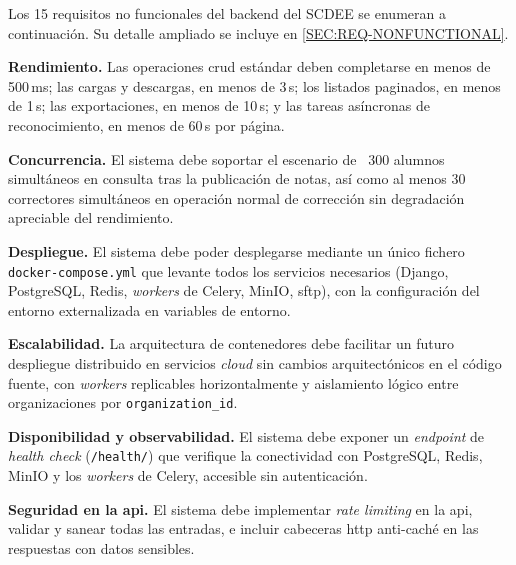 Los 15 requisitos no funcionales del backend del SCDEE se enumeran a
continuación. Su detalle ampliado se incluye en \cref{SEC:REQ-NONFUNCTIONAL}.

\begin{nonfunctional}

  \item \textbf{Rendimiento.} \label{rnf:performance}
  Las operaciones \acs{crud} estándar deben completarse en menos de
  500\,ms; las cargas y descargas, en menos de 3\,s; los listados
  paginados, en menos de 1\,s; las exportaciones, en menos de 10\,s; y las
  tareas asíncronas de reconocimiento, en menos de 60\,s por página.

  \item \textbf{Concurrencia.} \label{rnf:concurrency}
  El sistema debe soportar el escenario de ~300 alumnos simultáneos en
  consulta tras la publicación de notas, así como al menos 30 correctores
  simultáneos en operación normal de corrección sin degradación apreciable
  del rendimiento.

  \item \textbf{Despliegue.} \label{rnf:deployment}
  El sistema debe poder desplegarse mediante un único fichero
  \texttt{docker-compose.yml} que levante todos los servicios necesarios
  (Django, PostgreSQL, Redis, \textit{workers} de Celery, MinIO,
  \acs{sftp}), con la configuración del entorno externalizada en
  variables de entorno.

  \item \textbf{Escalabilidad.} \label{rnf:scalability}
  La arquitectura de contenedores debe facilitar un futuro despliegue
  distribuido en servicios \textit{cloud} sin cambios arquitectónicos en
  el código fuente, con \textit{workers} replicables horizontalmente y
  aislamiento lógico entre organizaciones por \texttt{organization\_id}.

  \item \textbf{Disponibilidad y observabilidad.}
  \label{rnf:availability}
  El sistema debe exponer un \textit{endpoint} de \textit{health check}
  (\texttt{/health/}) que verifique la conectividad con PostgreSQL, Redis,
  MinIO y los \textit{workers} de Celery, accesible sin autenticación.

  \item \textbf{Seguridad en la \acs{api}.} \label{rnf:api-security}
  El sistema debe implementar \textit{rate limiting} en la \acs{api},
  validar y sanear todas las entradas, e incluir cabeceras \acs{http}
  anti-caché en las respuestas con datos sensibles.


\end{nonfunctional}
